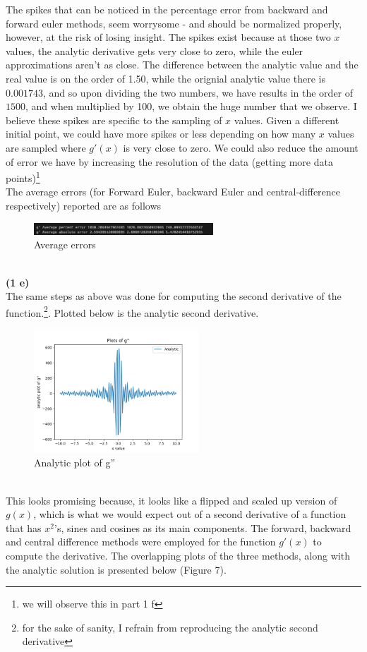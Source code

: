\documentclass[12pt]{article}
\begin{document}
The spikes that can be noticed in the percentage error from backward and forward euler methods, seem worrysome - and should be normalized properly, however, at the risk of losing insight. The spikes exist because at those two $x$ values, the analytic derivative gets very close to zero, while the euler approximations aren't as close. The difference between the analytic value and the real value is on the order of 1.50, while the orignial analytic value there is $0.001743$, and so upon dividing the two numbers, we have results in the order of $1500$, and when multiplied by 100, we obtain the huge number that we observe. I believe these spikes are specific to the sampling of $x$ values. Given a different initial point, we could have more spikes or less depending on how many $x$ values are sampled where $g'(x)$ is very close to zero. We could also reduce the amount of error we have by increasing the resolution of the data (getting more data points)\footnote{we will observe this in part 1 f}\\
The average errors (for Forward Euler, backward Euler and central-difference respectively) reported are as follows 
\begin{figure}[h]
	\centering
	\includegraphics[width=0.60\textwidth]{error200gpr.png}
	\caption{Average errors}
\end{figure}\\
\textbf{(1 e)} \\ The same steps as above was done for computing the second derivative of the function.\footnote{for the sake of sanity, I refrain from reproducing the analytic second derivative}. Plotted below is the analytic second derivative. 
\begin{figure}[h]
	\centering
	\includegraphics[width=0.55\textwidth]{gdpranalytic.png}
	\caption{Analytic plot of g''}
\end{figure}\\ This looks promising because, it looks like a flipped and scaled up version of $g(x)$, which is what we would expect out of a second derivative of a function that has $x^2$'s, sines and cosines as its main components. The forward, backward and central difference methods were employed for the function $g'(x)$ to compute the derivative. The overlapping plots of the three methods, along with the analytic solution is presented below (Figure 7). 
\end{document}
